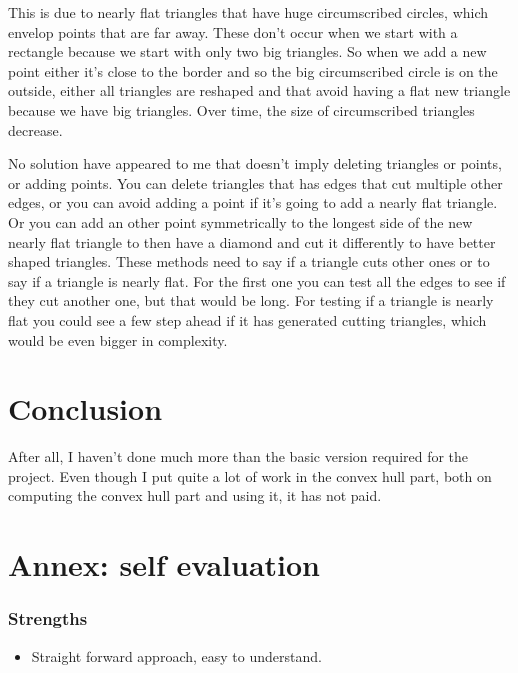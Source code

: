 \documentclass[a4paper,11pt]{article}%
\begin{document}
This is due to nearly flat triangles that have huge circumscribed circles, which envelop points that are far away. These don't occur when we start with a rectangle because we start with only two big triangles. So when we add a new point either it's close to the border and so the big circumscribed circle is on the outside, either all triangles are reshaped and that avoid having a flat new triangle because we have big triangles. Over time, the size of circumscribed triangles decrease.

No solution have appeared to me that doesn't imply deleting triangles or points, or adding points. You can delete triangles that has edges that cut multiple other edges, or you can avoid adding a point if it's going to add a nearly flat triangle. Or you can add an other point symmetrically to the longest side of the new nearly flat triangle to then have a diamond and cut it differently to have better shaped triangles. These methods need to say if a triangle cuts other ones or to say if a triangle is nearly flat. For the first one you can test all the edges to see if they cut another one, but that would be long. For testing if a triangle is nearly flat you could see a few step ahead if it has generated cutting triangles, which would be even bigger in complexity.

\section{Conclusion}
After all, I haven't done much more than the basic version required for the project. Even though I put quite a lot of work in the convex hull part, both on computing the convex hull part and using it, it has not paid.


\clearpage %

\appendix %


\section{Annex: self evaluation}

\subsubsection*{Strengths}
\begin{itemize}
\item Straight forward approach, easy to understand.
\end{itemize}
\end{document}
